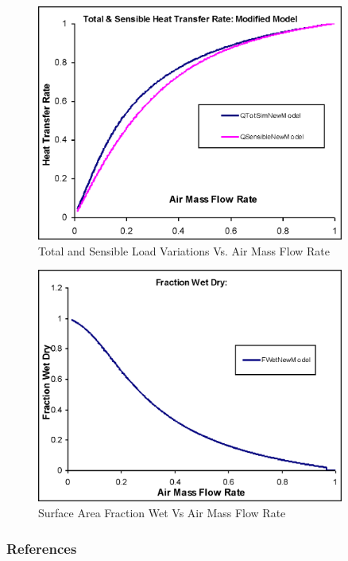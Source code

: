 \begin{figure}[hbtp] %
\centering
\includegraphics[width=0.9\textwidth, height=0.9\textheight, keepaspectratio=true]{media/image3350.png}
\caption{Total and Sensible Load Variations Vs. Air Mass Flow Rate \protect \label{fig:total-and-sensible-load-variations-vs-air}}
\end{figure}

\begin{figure}[hbtp] %
\centering
\includegraphics[width=0.9\textwidth, height=0.9\textheight, keepaspectratio=true]{media/image3351.png}
\caption{Surface Area Fraction Wet Vs Air Mass Flow Rate \protect \label{fig:surface-area-fraction-wet-vs-air-mass-flow}}
\end{figure}

\subsubsection{References}\label{references-011}

